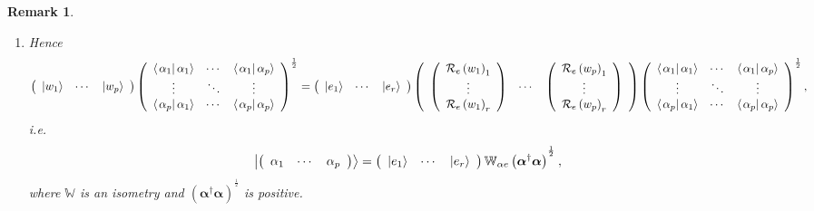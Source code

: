 \documentclass[aps,preprint]{revtex4}%
\newtheorem{remark}[theorem]{Remark}
\begin{document}
\begin{remark}
\begin{enumerate}
\begin{enumerate}
\item Hence
\begin{equation}
\left(
\begin{array}
[c]{ccc}%
\left\vert w_{1}\right\rangle  & \cdots & \left\vert w_{p}\right\rangle
\end{array}
\right)  \left(
\begin{array}
[c]{ccc}%
\left\langle \left.  \alpha_{1}\right\vert \alpha_{1}\right\rangle  & \cdots &
\left\langle \left.  \alpha_{1}\right\vert \alpha_{p}\right\rangle \\
\vdots & \ddots & \vdots\\
\left\langle \left.  \alpha_{p}\right\vert \alpha_{1}\right\rangle  & \cdots &
\left\langle \left.  \alpha_{p}\right\vert \alpha_{p}\right\rangle
\end{array}
\right)  ^{\frac{1}{2}}=\left(
\begin{array}
[c]{ccc}%
\left\vert e_{1}\right\rangle  & \cdots & \left\vert e_{r}\right\rangle
\end{array}
\right)  \left(
\begin{array}
[c]{ccc}%
\left(
\begin{array}
[c]{c}%
\mathcal{R}_{e}\left(  w_{1}\right)  _{1}\\
\vdots\\
\mathcal{R}_{e}\left(  w_{1}\right)  _{r}%
\end{array}
\right)  & \cdots & \left(
\begin{array}
[c]{c}%
\mathcal{R}_{e}\left(  w_{p}\right)  _{1}\\
\vdots\\
\mathcal{R}_{e}\left(  w_{p}\right)  _{r}%
\end{array}
\right)
\end{array}
\right)  \left(
\begin{array}
[c]{ccc}%
\left\langle \left.  \alpha_{1}\right\vert \alpha_{1}\right\rangle  & \cdots &
\left\langle \left.  \alpha_{1}\right\vert \alpha_{p}\right\rangle \\
\vdots & \ddots & \vdots\\
\left\langle \left.  \alpha_{p}\right\vert \alpha_{1}\right\rangle  & \cdots &
\left\langle \left.  \alpha_{p}\right\vert \alpha_{p}\right\rangle
\end{array}
\right)  ^{\frac{1}{2}},
\end{equation}
i.e.
\begin{equation}
\left\vert \left(
\begin{array}
[c]{ccc}%
\alpha_{1} & \cdots & \alpha_{p}%
\end{array}
\right)  \right\rangle =\left(
\begin{array}
[c]{ccc}%
\left\vert e_{1}\right\rangle  & \cdots & \left\vert e_{r}\right\rangle
\end{array}
\right)  \mathbb{W}_{\alpha e}\left(  \boldsymbol{\alpha}^{\dagger
}\boldsymbol{\alpha}\right)  ^{^{\frac{1}{2}}},
\end{equation}
where $\mathbb{W}$ is an isometry and $\left(  \boldsymbol{\alpha}^{\dagger
}\boldsymbol{\alpha}\right)  ^{^{\frac{1}{2}}}$ is positive.


\end{enumerate}
\end{enumerate}
\end{remark}
\end{document}
